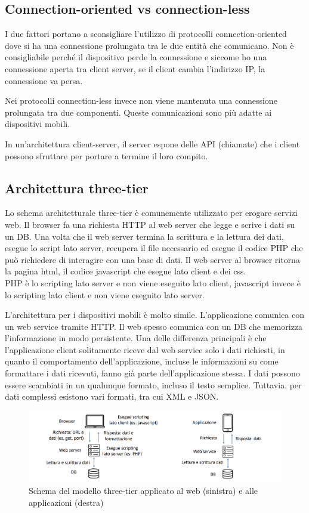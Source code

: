 \subsection{Connection-oriented vs connection-less}
I due fattori portano a sconsigliare l'utilizzo di protocolli connection-oriented dove si ha una connessione prolungata tra le due entità che comunicano.
Non è consigliabile perché il dispositivo perde la connessione e siccome ho una connessione aperta tra client server, se il client cambia l'indirizzo IP, la connessione va persa.

Nei protocolli connection-less invece non viene mantenuta una connessione prolungata tra due componenti. 
Queste comunicazioni sono più adatte ai dispositivi mobili. 

In un'architettura client-server, il server espone delle API (chiamate) che i client possono sfruttare per portare a termine il loro compito. 

\subsection{Architettura three-tier}
Lo schema architetturale three-tier è comunemente utilizzato per erogare servizi web. 
Il browser fa una richiesta HTTP al web server che legge e scrive i dati su un DB. Una volta che il web server termina la scrittura e la lettura dei dati, esegue lo script lato server, recupera il file necessario ed esegue il codice PHP che può richiedere di interagire con una base di dati. Il web server al browser ritorna la pagina html, il codice javascript che esegue lato client e dei css.
\\ PHP è lo scripting lato server e non viene eseguito lato client, javascript invece è lo scripting lato client e non viene eseguito lato server.

L'architettura per i dispositivi mobili è molto simile.
L'applicazione comunica con un web service tramite HTTP. Il web spesso comunica con un DB che memorizza l'informazione in modo persistente. 
Una delle differenza principali è che l'applicazione client
solitamente riceve dal web service solo i dati richiesti, in quanto il comportamento dell'applicazione, incluse le informazioni su come formattare i dati ricevuti, fanno già parte dell'applicazione stessa. I dati possono essere scambiati in un qualunque formato, incluso il testo semplice. Tuttavia, per dati complessi esistono vari formati, tra cui XML e JSON.

\begin{figure}
    \centering
    \includegraphics[width=\textwidth]{images/Mobile computing/3. Reti e architetture/architettura tt.png}
    \caption{Schema del modello three-tier applicato al web (sinistra) e alle applicazioni (destra)}
    \label{fig:architettura tt}
\end{figure}

